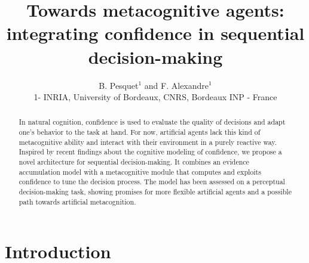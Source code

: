 \documentclass{esannV2}
\begin{document}
\title{Towards metacognitive agents: integrating confidence in sequential decision-making}

\author{B. Pesquet$^1$ and F. Alexandre$^1$
%
%
\vspace{.3cm}\\
%
1- INRIA, University of Bordeaux, CNRS, Bordeaux INP - France
%
}

\maketitle

\begin{abstract}
In natural cognition, confidence is used to evaluate the quality of decisions and adapt one's behavior to the task at hand. For now, artificial agents lack this kind of metacognitive ability and interact with their environment in a purely reactive way. Inspired by recent findings about the cognitive modeling of confidence, we propose a novel architecture for sequential decision-making. It combines an evidence accumulation model with a metacognitive module that computes and exploits confidence to tune the decision process. The model has been assessed on a perceptual decision-making task, showing promises for more flexible artificial agents and a possible path towards artificial metacognition.

\end{abstract}

\section{Introduction}
\end{document}
